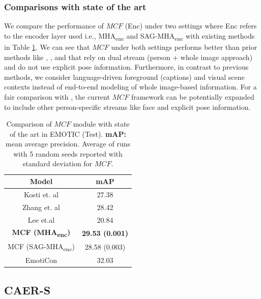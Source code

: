 \subsubsection{Comparisons with state of the art}
We compare the performance of $MCF$ (Enc) under two settings where Enc refers to the encoder layer used i.e., MHA\textsubscript{enc} and SAG-MHA\textsubscript{enc} with existing methods in Table \ref{MHAEnc}. We can see that $MCF$ under both settings performs better than prior methods like  \cite{kostiPAMI}, \cite{CAGER}, and \cite{CAER-S} that rely on dual stream (person + whole image approach) and do not use explicit pose information. Furthermore, in contrast to previous methods, we consider language-driven foreground (captions) and visual scene contexts instead of end-to-end modeling of whole image-based information. For a fair comparison with \cite{Mittal2020EmotiConCM}, the current $MCF$ framework can be potentially expanded to include other person-specific streams like face and explicit pose information.
\begin{table}[h!]
\centering
\begin{tabular}{|c|c|}
\hline

\textbf{Model}   & \textbf{mAP}   \\ \hline
Kosti et. al \cite{kostiPAMI} & 27.38          \\ \hline
Zhang et. al  \cite{CAGER}   & 28.42          \\ \hline
Lee et.al  \cite{CAER-S}      & 20.84          \\ \hline
\textbf{MCF (MHA\textsubscript{enc})}     & \textbf{29.53 (0.001)} \\ \hline
MCF (SAG-MHA\textsubscript{enc}) & 28.58 (0.003)  \\ \hline
EmotiCon \cite{Mittal2020EmotiConCM}       & 32.03          \\ \hline
\end{tabular}
\caption{Comparison of $MCF$ module with state of the art in EMOTIC (Test). \textbf{mAP:} mean average precision. Average of runs with 5 random seeds reported with standard deviation for $MCF$.}
\label{MHAEnc}
\end{table}
\subsection{CAER-S}
